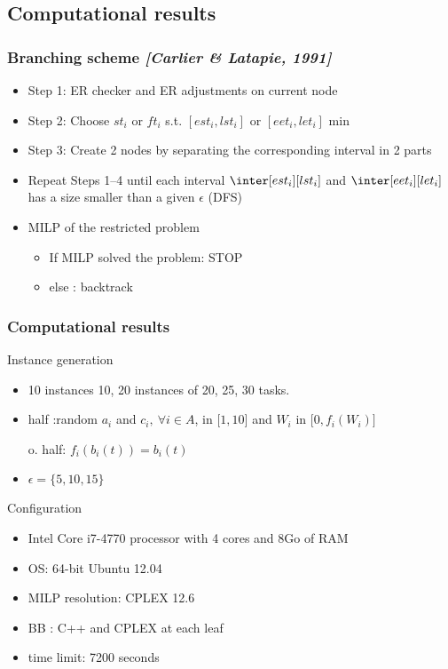   \subsection{Computational results}

  \begin{frame}
    \frametitle{Branching scheme {\small \it \color{gray!50!black!50} [Carlier \& Latapie, 1991]}}
    \begin{itemize}
      \vfill
    \item Step 1: ER checker and ER adjustments on current node 
      \vfill    
    \item Step 2: Choose $st_i$ or $ft_i$ s.t. $[est_i,lst_i]$ or
      $[eet_i,let_i]$ min
      \vfill
    \item Step 3: Create 2 nodes by separating the corresponding interval in 2 parts
      \vfill
    \item{\color{red!80!black!80} Repeat Steps 1--4 until each interval $\inter[est_i][lst_i]$ and $\inter[eet_i][let_i]$ has a size smaller than a given $\epsilon$ (DFS)}
      \vfill
    \item MILP of the restricted problem
      \begin{itemize}
      \item If MILP solved the problem: STOP
      \item else : backtrack
      \end{itemize}
    \end{itemize}
    \vfill
  \end{frame}


  \begin{frame}
    \frametitle{Computational results}
    \vfill
    \begin{block}{Instance generation}
      \begin{itemize}
      \item 10 instances 10, 20 instances of 20, 25, 30 tasks. 
      \item half :random  $a_i$ and $c_i,\ \forall i \in A$, in ${[}1,10{]}$
        and $W_i$ in ${[}0,f_i(W_i){]}$

        o. half: $f_i(b_i(t))= b_i(t)$
      \item $\epsilon = \{5, 10, 15\}$ 
      \end{itemize}
    \end{block}
    \vfill
    \pause
    \begin{block}{Configuration}
      \begin{itemize}
      \item Intel Core i7-4770 processor with 4 cores and 8Go of RAM
      \item OS: 64-bit Ubuntu 12.04
      \item MILP resolution: CPLEX 12.6  
      \item BB : C++ and CPLEX at each leaf
      \item time limit: 7200 seconds
      \end{itemize}
    \end{block}
    \vfill
  \end{frame}


